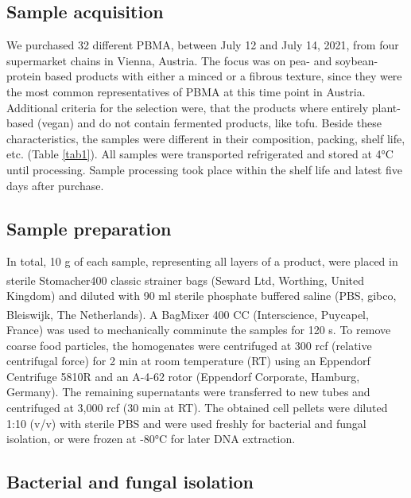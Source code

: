 \documentclass[preprint,3p,
a4paper]{elsarticle} %
\begin{document}
\hypertarget{sample-acquisition}{%
\subsection{Sample acquisition}\label{sample-acquisition}}

We purchased 32 different PBMA, between July 12 and July 14, 2021, from
four supermarket chains in Vienna, Austria. The focus was on pea- and
soybean- protein based products with either a minced or a fibrous
texture, since they were the most common representatives of PBMA at this
time point in Austria. Additional criteria for the selection were, that
the products where entirely plant-based (vegan) and do not contain
fermented products, like tofu. Beside these characteristics, the samples
were different in their composition, packing, shelf life, etc. (Table
\ref{tab1}). All samples were transported refrigerated and stored at 4°C
until processing. Sample processing took place within the shelf life and
latest five days after purchase.

\hypertarget{sample-preparation}{%
\subsection{Sample preparation}\label{sample-preparation}}

In total, 10 g of each sample, representing all layers of a product,
were placed in sterile Stomacher\textsuperscript{\textregistered}400
classic strainer bags (Seward Ltd, Worthing, United Kingdom) and diluted
with 90 ml sterile phosphate buffered saline (PBS, gibco, Bleiswijk, The
Netherlands). A BagMixer\textsuperscript{\textregistered} 400 CC
(Interscience, Puycapel, France) was used to mechanically comminute the
samples for 120 s. To remove coarse food particles, the homogenates were
centrifuged at 300 rcf (relative centrifugal force) for 2 min at room
temperature (RT) using an Eppendorf Centrifuge 5810R and an A-4-62 rotor
(Eppendorf Corporate, Hamburg, Germany). The remaining supernatants were
transferred to new tubes and centrifuged at 3,000 rcf (30 min at RT).
The obtained cell pellets were diluted 1:10 (v/v) with sterile PBS and
were used freshly for bacterial and fungal isolation, or were frozen at
-80°C for later DNA extraction.

\hypertarget{bacterial-and-fungal-isolation}{%
\subsection{Bacterial and fungal
isolation}\label{bacterial-and-fungal-isolation}}
\end{document}
